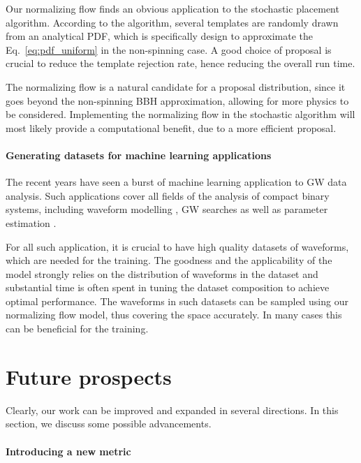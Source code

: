 \documentclass[twocolumn,showpacs,preprintnumbers,nofootinbib,prd,
superscriptaddress,10pt]{revtex4-2}
\begin{document}
Our normalizing flow finds an obvious application to the stochastic placement algorithm. According to the algorithm, several templates are randomly drawn from an analytical PDF, which is specifically design to approximate the Eq.~\eqref{eq:pdf_uniform} in the non-spinning case.
A good choice of proposal is crucial to reduce the template rejection rate, hence reducing the overall run time.

The normalizing flow is a natural candidate for a proposal distribution, since it goes beyond the non-spinning BBH approximation, allowing for more physics to be considered. Implementing the normalizing flow in the stochastic algorithm will most likely provide a computational benefit, due to a more efficient proposal.

\paragraph{Generating datasets for machine learning applications}

The recent years have seen a burst of machine learning application to GW data analysis. Such applications cover all fields of the analysis of compact binary systems, including waveform modelling \cite{Khan:2020fso, PhysRevD.103.043020, Thomas:2022rmc, Tissino:2022thn}, GW searches \cite{Gebhard:2019ldz, Schafer:2020kor, Schafer:2021fea, Baltus:2021nme} as well as parameter estimation \cite{Green:2020hst, Alvares:2020bjg, Williams:2021qyt, Langendorff:2022fzq, Williams:2023ppp}.

For all such application, it is crucial to have high quality datasets of waveforms, which are needed for the training.
The goodness and the applicability of the model strongly relies on the distribution of waveforms in the dataset and substantial time is often spent in tuning the dataset composition to achieve optimal performance.
The waveforms in such datasets can be sampled using our normalizing flow model, thus covering the space accurately. In many cases this can be beneficial for the training.

\section{Future prospects} \label{sec:improvements}

Clearly, our work can be improved and expanded in several directions. In this section, we discuss some possible advancements.

\paragraph{Introducing a new metric}
\end{document}
